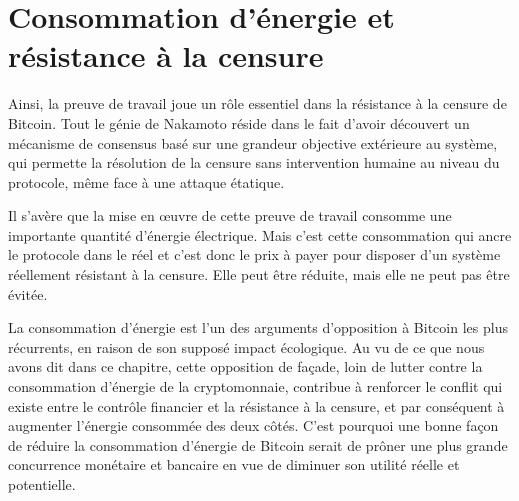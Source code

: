 
\section*{Consommation d'énergie et résistance à la censure}

Ainsi, la preuve de travail joue un rôle essentiel dans la résistance à la censure de Bitcoin. Tout le génie de Nakamoto réside dans le fait d'avoir découvert un mécanisme de consensus basé sur une grandeur objective extérieure au système, qui permette la résolution de la censure sans intervention humaine au niveau du protocole, même face à une attaque étatique.

Il s'avère que la mise en œuvre de cette preuve de travail consomme une importante quantité d'énergie électrique. Mais c'est cette consommation qui ancre le protocole dans le réel et c'est donc le prix à payer pour disposer d'un système réellement résistant à la censure. Elle peut être réduite, mais elle ne peut pas être évitée.

La consommation d'énergie est l'un des arguments d'opposition à Bitcoin les plus récurrents, en raison de son supposé impact écologique. Au vu de ce que nous avons dit dans ce chapitre, cette opposition de façade, loin de lutter contre la consommation d'énergie de la cryptomonnaie, contribue à renforcer le conflit qui existe entre le contrôle financier et la résistance à la censure, et par conséquent à augmenter l'énergie consommée des deux côtés. C'est pourquoi une bonne façon de réduire la consommation d'énergie de Bitcoin serait de prôner une plus grande concurrence monétaire et bancaire en vue de diminuer son utilité réelle et potentielle.

